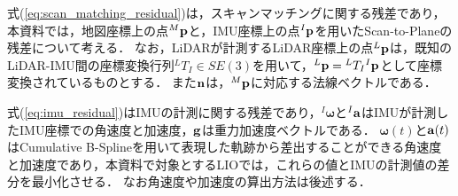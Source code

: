 式(\ref{eq:scan_matching_residual})は，スキャンマッチングに関する残差であり，本資料では，地図座標上の点${}^{M}{\bf p}$と，IMU座標上の点${}^{I}{\bf p}$を用いたScan-to-Planeの残差について考える．
なお，LiDARが計測するLiDAR座標上の点${}^{L}{\bf p}$は，既知のLiDAR-IMU間の座標変換行列${}^{L}T_{I} \in SE(3)$を用いて，${}^{L}{\bf p} = {}^{L}T_{I} {}^{I}{\bf p}$として座標変換されているものとする．
また${\bf n}$は，${}^{M}{\bf p}$に対応する法線ベクトルである．


式(\ref{eq:imu_residual})はIMUの計測に関する残差であり，${}^{I}\boldsymbol \omega$と${}^{I}{\bf a}$はIMUが計測したIMU座標での角速度と加速度，${\bf g}$は重力加速度ベクトルである．
$\boldsymbol \omega(t)$と${\bf a}(t)$はCumulative B-Splineを用いて表現した軌跡から差出することができる角速度と加速度であり，本資料で対象とするLIOでは，これらの値とIMUの計測値の差分を最小化させる．
なお角速度や加速度の算出方法は後述する．

